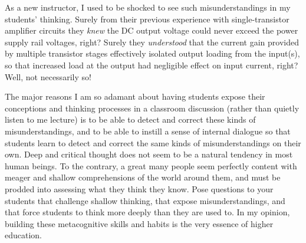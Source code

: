 As a new instructor, I used to be shocked to see such misunderstandings in my students' thinking.  Surely from their previous experience with single-transistor amplifier circuits they {\it knew} the DC output voltage could never exceed the power supply rail voltages, right?  Surely they {\it understood} that the current gain provided by multiple transistor stages effectively isolated output loading from the input(s), so that increased load at the output had negligible effect on input current, right?  Well, not necessarily so!

The major reasons I am so adamant about having students expose their conceptions and thinking processes in a classroom discussion (rather than quietly listen to me lecture) is to be able to detect and correct these kinds of misunderstandings, and to be able to instill a sense of internal dialogue so that students learn to detect and correct the same kinds of misunderstandings on their own.  Deep and critical thought does not seem to be a natural tendency in most human beings.  To the contrary, a great many people seem perfectly content with meager and shallow comprehensions of the world around them, and must be prodded into assessing what they think they know.  Pose questions to your students that challenge shallow thinking, that expose misunderstandings, and that force students to think more deeply than they are used to.  In my opinion, building these metacognitive skills and habits is the very essence of higher education.




